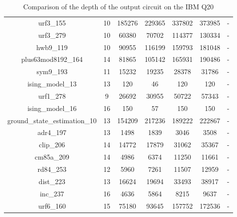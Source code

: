 \documentclass[runningheads]{llncs}
\begin{document}
\begin{table}[H]
\begin{center}
\begin{tabular}{|c|c|c|c|c|c|c|}
									urf3\_155 & 10 & 185276 & 229365 & 337802 & 373985 & - \\
									urf3\_279 & 10 & 60380 & 70702 & 114377 & 130334 & - \\
									hwb9\_119 & 10 & 90955 & 116199 & 159793 & 181048 & - \\
									plus63mod8192\_164 & 14 & 81865 & 105142 & 165931 & 190486 & - \\
									sym9\_193 & 11 & 15232 & 19235 & 28378 & 31786 & - \\
									ising\_model\_13 & 13 & 120 & 46 & 120 & 120 & - \\
									urf1\_278 & 9 & 26692 & 30955 & 50722 & 57343 & - \\
									ising\_model\_16 & 16 & 150 & 57 & 150 & 150 & - \\
									ground\_state\_estimation\_10 & 13 & 154209 & 217236 & 189222 & 222867 & - \\
									adr4\_197 & 13 & 1498 & 1839 & 3046 & 3508 & - \\
									clip\_206 & 14 & 14772 & 17879 & 31062 & 35367 & - \\
									cm85a\_209 & 14 & 4986 & 6374 & 11250 & 11661 & - \\
									rd84\_253 & 12 & 5960 & 7261 & 11507 & 12959 & - \\
									dist\_223 & 13 & 16624 & 19694 & 33493 & 38917 & - \\
									inc\_237 & 16 & 4636 & 5864 & 8215 & 9637 & - \\
									urf6\_160 & 15 & 75180 & 93645 & 157752 & 172536 & - \\
								\hline
									\end{tabular} 
									\end{center}						
									\caption{Comparison of  the depth of the output circuit on the IBM Q20}  
									\label{tab9}
								\end{table}
\end{document}
